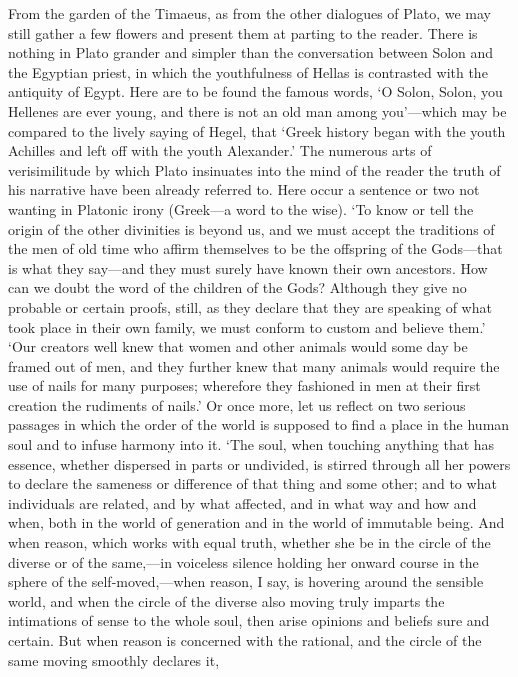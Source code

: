 From the garden of the Timaeus, as from the other dialogues of Plato, we
may still gather a few flowers and present them at parting to the reader.
There is nothing in Plato grander and simpler than the conversation
between Solon and the Egyptian priest, in which the youthfulness of Hellas
is contrasted with the antiquity of Egypt. Here are to be found the famous
words, ‘O Solon, Solon, you Hellenes are ever young, and there is not an
old man among you’—which may be compared to the lively saying of
Hegel, that ‘Greek history began with the youth Achilles and left off with
the youth Alexander.’ The numerous arts of verisimilitude by which Plato
insinuates into the mind of the reader the truth of his narrative have
been already referred to. Here occur a sentence or two not wanting in
Platonic irony (Greek—a word to the wise). ‘To know or tell the
origin of the other divinities is beyond us, and we must accept the
traditions of the men of old time who affirm themselves to be the
offspring of the Gods—that is what they say—and they must
surely have known their own ancestors. How can we doubt the word of the
children of the Gods? Although they give no probable or certain proofs,
still, as they declare that they are speaking of what took place in their
own family, we must conform to custom and believe them.’ ‘Our creators
well knew that women and other animals would some day be framed out of
men, and they further knew that many animals would require the use of
nails for many purposes; wherefore they fashioned in men at their first
creation the rudiments of nails.’ Or once more, let us reflect on two
serious passages in which the order of the world is supposed to find a
place in the human soul and to infuse harmony into it. ‘The soul, when
touching anything that has essence, whether dispersed in parts or
undivided, is stirred through all her powers to declare the sameness or
difference of that thing and some other; and to what individuals are
related, and by what affected, and in what way and how and when, both in
the world of generation and in the world of immutable being. And when
reason, which works with equal truth, whether she be in the circle of the
diverse or of the same,—in voiceless silence holding her onward
course in the sphere of the self-moved,—when reason, I say, is
hovering around the sensible world, and when the circle of the diverse
also moving truly imparts the intimations of sense to the whole soul, then
arise opinions and beliefs sure and certain. But when reason is concerned
with the rational, and the circle of the same moving smoothly declares it,
